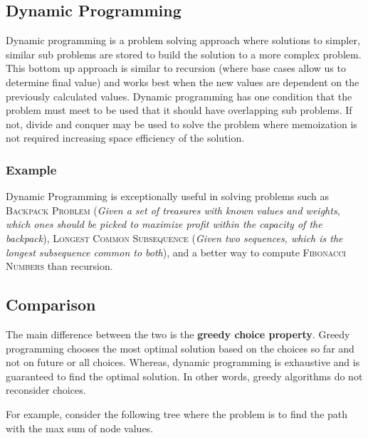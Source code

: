 \documentclass{article}
\begin{document}
\subsection{Dynamic Programming}
Dynamic programming is a problem solving approach where solutions to simpler, similar sub problems are stored to build the solution to a more complex problem. This bottom up approach is similar to recursion (where base cases allow us to determine final value) and works best when the new values are dependent on the previously calculated values. Dynamic programming has one condition that the problem must meet to be used that it should have overlapping sub problems. If not, divide and conquer may be used to solve the problem where memoization is not required increasing space efficiency of the solution.

\subsubsection{Example}
Dynamic Programming is exceptionally useful in solving problems such as \textsc{Backpack Problem} (\textit{Given a set of treasures with known values and weights, which ones should be picked to maximize profit within the capacity of the backpack}), \textsc{Longest Common Subsequence} (\textit{Given two sequences, which is the longest subsequence common to both}), and a better way to compute \textsc{Fibonacci Numbers} than recursion.

\subsection{Comparison}
The main difference between the two is the \textbf{greedy choice property}. Greedy programming chooses the most optimal solution based on the choices so far and not on future or all choices. Whereas, dynamic programming is exhaustive and is guaranteed to find the optimal solution. In other words, greedy algorithms do not reconsider choices.

For example, consider the following tree where the problem is to find the path with the max sum of node values.
\end{document}
